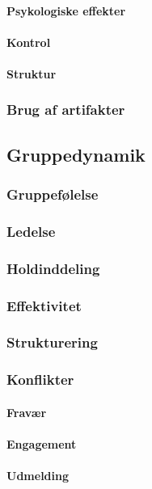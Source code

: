 \paragraph{Psykologiske effekter}
\paragraph{Kontrol}
\paragraph{Struktur}
\subsubsection{Brug af artifakter}


\subsection{Gruppedynamik}
\subsubsection{Gruppefølelse}
\subsubsection{Ledelse}
\subsubsection{Holdinddeling}
\subsubsection{Effektivitet}
\subsubsection{Strukturering}
\subsubsection{Konflikter}
\paragraph{Fravær}
\paragraph{Engagement}
\paragraph{Udmelding}
